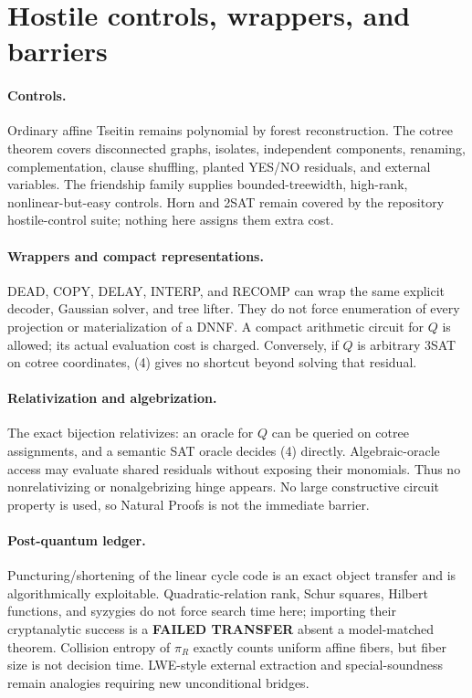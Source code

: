 \documentclass[11pt]{article}
\begin{document}
\section{Hostile controls, wrappers, and barriers}
\paragraph{Controls.}
Ordinary affine Tseitin remains polynomial by forest reconstruction.  The
cotree theorem covers disconnected graphs, isolates, independent components,
renaming, complementation, clause shuffling, planted YES/NO residuals, and
external variables.  The friendship family supplies bounded-treewidth,
high-rank, nonlinear-but-easy controls.  Horn and 2SAT remain covered by the
repository hostile-control suite; nothing here assigns them extra cost.

\paragraph{Wrappers and compact representations.}
DEAD, COPY, DELAY, INTERP, and RECOMP can wrap the same explicit decoder,
Gaussian solver, and tree lifter.  They do not force enumeration of every
projection or materialization of a DNNF.  A compact arithmetic circuit for
$Q$ is allowed; its actual evaluation cost is charged.  Conversely, if $Q$
is arbitrary 3SAT on cotree coordinates, (4) gives no shortcut beyond solving
that residual.

\paragraph{Relativization and algebrization.}
The exact bijection relativizes: an oracle for $Q$ can be queried on cotree
assignments, and a semantic SAT oracle decides (4) directly.  Algebraic-oracle
access may evaluate shared residuals without exposing their monomials.  Thus
no nonrelativizing or nonalgebrizing hinge appears.  No large constructive
circuit property is used, so Natural Proofs is not the immediate barrier.

\paragraph{Post-quantum ledger.}
Puncturing/shortening of the linear cycle code is an exact object transfer and
is algorithmically exploitable.  Quadratic-relation rank, Schur squares,
Hilbert functions, and syzygies do not force search time here; importing their
cryptanalytic success is a \textbf{FAILED TRANSFER} absent a model-matched
theorem.  Collision entropy of $\pi_R$ exactly counts uniform affine fibers,
but fiber size is not decision time.  LWE-style external extraction and
special-soundness remain analogies requiring new unconditional bridges.
\end{document}
